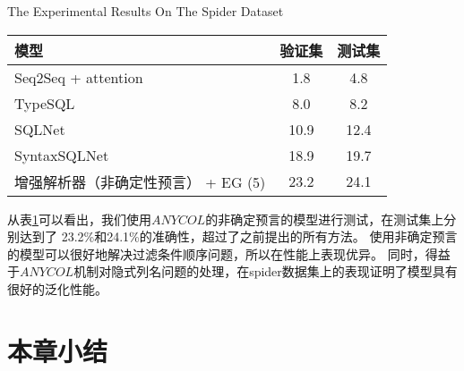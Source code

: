 \begin{table}[!htpb]
    {The Experimental Results On The Spider Dataset}
  \label{tab:ssjjsdsyjg}
  \centering
  \begin{threeparttable}[b]
     \begin{tabular}{lcc}
      \toprule
      模型 & 验证集 & 测试集\\
      \midrule
      Seq2Seq + attention & 1.8	& 4.8\\
      TypeSQL & 8.0	& 8.2\\
      SQLNet & 10.9	& 12.4\\
      SyntaxSQLNet & 18.9	& 19.7\\
      增强解析器（非确定性预言） + EG (5) & 23.2  & 24.1\\
      \bottomrule
    \end{tabular}
  \end{threeparttable}
\end{table}

从表\ref{tab:ssjjsdsyjg}可以看出，我们使用$ANYCOL$的非确定预言的模型进行测试，在测试集上分别达到了 23.2\%和24.1\%的准确性，超过了之前提出的所有方法。
使用非确定预言的模型可以很好地解决过滤条件顺序问题，所以在性能上表现优异。
同时，得益于$ANYCOL$机制对隐式列名问题的处理，在spider数据集上的表现证明了模型具有很好的泛化性能。


\section{本章小结}


